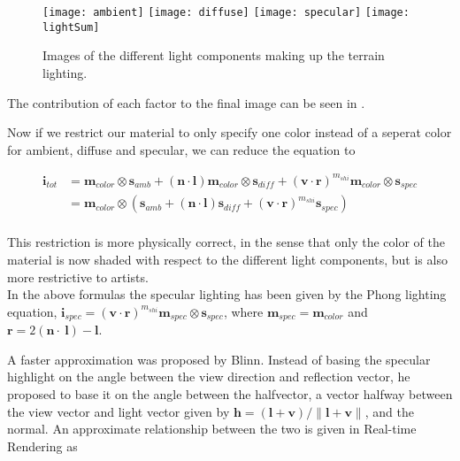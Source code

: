 
\begin{figure}
  \label{fig:lightComponents}
  \centering
  \texttt{[image: ambient]}
  \texttt{[image: diffuse]}
  \texttt{[image: specular]}
  \texttt{[image: lightSum]}
  \caption{Images of the different light components making up the terrain lighting.}
\end{figure}


The contribution of each factor to the final image can be seen in
.

Now if we restrict our material to only specify one color instead of a
seperat color for ambient, diffuse and specular, we can reduce the
equation to 

\begin{displaymath}
  \begin{array}{rl}
    \mathbf{i}_{tot} &= \mathbf{m}_{color} \otimes \mathbf{s}_{amb} + (\mathbf{n} \cdot
    \mathbf{l}) \mathbf{m}_{color} \otimes \mathbf{s}_{diff} +
    (\mathbf{v} \cdot \mathbf{r})^{m_{shi}} \mathbf{m}_{color} \otimes
    \mathbf{s}_{spec} \\
    &= \mathbf{m}_{color} \otimes (\mathbf{s}_{amb} + (\mathbf{n} \cdot
    \mathbf{l}) \mathbf{s}_{diff} + (\mathbf{v} \cdot
    \mathbf{r})^{m_{shi}} \mathbf{s}_{spec}) \\
  \end{array}
\end{displaymath}

This restriction is more physically correct, in the sense that only
the color of the material is now shaded with respect to the different
light components, but is also more restrictive to artists.\\


In the above formulas the specular lighting has been given by the
Phong lighting equation, $\mathbf{i}_{spec} = (\mathbf{v} \cdot
\mathbf{r})^{m_{shi}} \mathbf{m}_{spec} \otimes \mathbf{s}_{spec}$,
where $\mathbf{m}_{spec} = \mathbf{m}_{color}$ and $\mathbf{r} = 2
(\mathbf{n} \cdot \ \mathbf{l}) - \mathbf{l}$.

A faster approximation was proposed by Blinn. Instead of basing the
specular highlight on the angle between the view direction and
reflection vector, he proposed to base it on the angle between the
halfvector, a vector halfway between the view vector and light vector
given by $\mathbf{h} = (\mathbf{l} + \mathbf{v}) / \|\mathbf{l} +
\mathbf{v}\|$, and the normal. An approximate relationship between the
two is given in Real-time Rendering as

